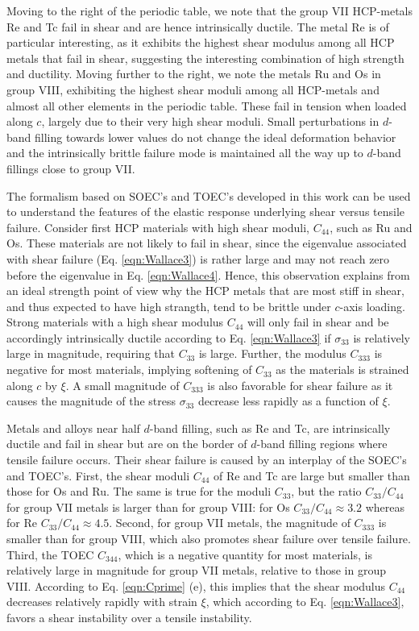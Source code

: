 \documentclass[showpacs,aps,floatfix,prb,reprint,superscriptaddress]{revtex4-1}
\begin{document}
Moving to the right of the periodic table, we note that the group VII HCP-metals Re and Tc fail in shear and are hence intrinsically ductile. The metal Re is of particular interesting, as it exhibits the highest shear modulus among all HCP metals that fail in shear, suggesting the interesting combination of high strength and ductility. Moving further to the right, we note the metals Ru and Os in group VIII, exhibiting the highest shear moduli among all HCP-metals and almost all other elements in the periodic table. These fail in tension when loaded along $c$, largely due to their very high shear moduli. Small perturbations in $d$-band filling towards lower values do not change the ideal deformation behavior and the intrinsically brittle failure mode is maintained all the way up to $d$-band fillings close to group VII.

The formalism based on SOEC's and TOEC's developed in this work can be used to understand the features of the elastic response underlying shear versus tensile failure. Consider first HCP materials with high shear moduli, $C_{44}$, such as Ru and Os. These materials are not likely to fail in shear, since the eigenvalue associated with shear failure (Eq. \ref{eqn:Wallace3}) is rather large and may not reach zero before the eigenvalue in Eq. \ref{eqn:Wallace4}. Hence, this observation explains from an ideal strength point of view why the HCP metals that are most stiff in shear, and thus expected to have high strangth, tend to be brittle under $c$-axis loading. Strong materials with a high shear modulus $C_{44}$ will only fail in shear and be accordingly intrinsically ductile according to Eq. \ref{eqn:Wallace3} if $\sigma_{33}$ is relatively large in magnitude, requiring that $C_{33}$ is large. Further, the modulus $C_{333}$ is negative for most materials, implying softening of $C_{33}$ as the materials is strained along $c$ by $\xi$. A small magnitude of $C_{333}$ is also favorable for shear failure as it causes the magnitude of the stress $\sigma_{33}$ decrease less rapidly as a function of $\xi$.

Metals and alloys near half $d$-band filling, such as Re and Tc, are intrinsically ductile and fail in shear but are on the border of $d$-band filling regions where tensile failure occurs. Their shear failure is caused by an interplay of the SOEC's and TOEC's. First, the shear moduli $C_{44}$ of Re and Tc are large but smaller than those for Os and Ru. The same is true for the moduli $C_{33}$, but the ratio $C_{33}/C_{44}$ for group VII metals is larger than for group VIII: for Os  $C_{33}/C_{44} \approx 3.2$ whereas for Re $C_{33}/C_{44} \approx 4.5$. Second, for group VII metals, the magnitude of $C_{333}$ is smaller than for group VIII, which also promotes shear failure over tensile failure. Third, the TOEC $C_{344}$, which is a negative quantity for most materials, is relatively large in magnitude for group VII metals, relative to those in group VIII. According to Eq. \ref{eqn:Cprime} (e), this implies that the shear modulus $C_{44}$ decreases relatively rapidly with strain $\xi$, which according to Eq. \ref{eqn:Wallace3}, favors a shear instability over a tensile instability. 
\end{document}
